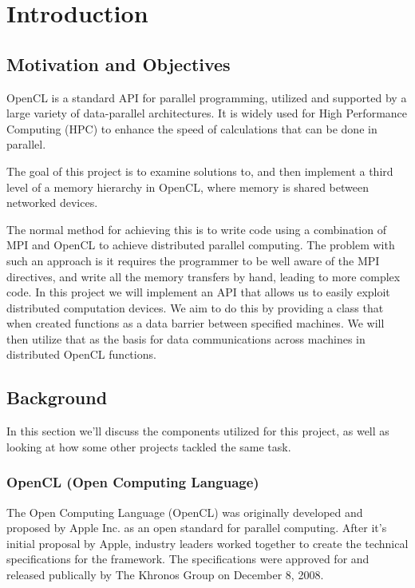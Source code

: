 \documentclass[../thesis.tex]{subfiles}
\begin{document}
\chapter{Introduction}

\section{Motivation and Objectives}
    OpenCL is a standard API for parallel programming, utilized and supported by a large variety of data-parallel architectures. It is widely used for High Performance Computing (HPC) to enhance the speed of calculations that can be done in parallel.

    The goal of this project is to examine solutions to, and then implement a third level of a memory hierarchy in OpenCL, where memory is shared between networked devices.

    The normal method for achieving this is to write code using a combination of MPI and OpenCL to achieve distributed parallel computing. The problem with such an approach is it requires the programmer to be well aware of the MPI directives, and write all the memory transfers by hand, leading to more complex code. In this project we will implement an API that allows us to easily exploit distributed computation devices. We aim to do this by providing a class that when created functions as a data barrier between specified machines. We will then utilize that as the basis for data communications across machines in distributed OpenCL functions. 


\section{Background}
    In this section we'll discuss the components utilized for this project, as well as looking at how some other projects tackled the same task.

    \subsection{OpenCL (Open Computing Language)} %
    \label{sub:opencl}
        The Open Computing Language (OpenCL) was originally developed and proposed by Apple Inc. as an open standard for parallel computing. After it's initial proposal by Apple, industry leaders worked together to create the technical specifications for the framework. The specifications were approved for and released publically by The Khronos Group on December 8, 2008\cite{opencl10pressrelease}.
\end{document}
